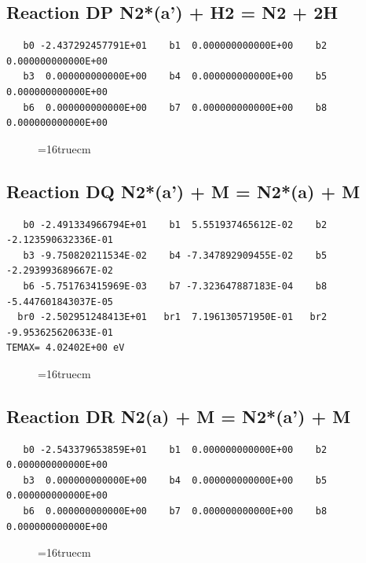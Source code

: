 \documentclass[12pt,dvipdfm]{article}
\begin{document}
\subsection{
Reaction DP N2*(a') + H2 = N2 + 2H}
\begin{small}\begin{verbatim}
   b0 -2.437292457791E+01    b1  0.000000000000E+00    b2  0.000000000000E+00
   b3  0.000000000000E+00    b4  0.000000000000E+00    b5  0.000000000000E+00
   b6  0.000000000000E+00    b7  0.000000000000E+00    b8  0.000000000000E+00
   \end{verbatim}\end{small}
\begin{figure}[h!]
\label{n2rates}
\epsfxsize=16truecm
\end{figure}
\newpage

\subsection{
Reaction DQ N2*(a') + M = N2*(a) + M }
\begin{small}\begin{verbatim}
   b0 -2.491334966794E+01    b1  5.551937465612E-02    b2 -2.123590632336E-01
   b3 -9.750820211534E-02    b4 -7.347892909455E-02    b5 -2.293993689667E-02
   b6 -5.751763415969E-03    b7 -7.323647887183E-04    b8 -5.447601843037E-05
  br0 -2.502951248413E+01   br1  7.196130571950E-01   br2 -9.953625620633E-01
TEMAX= 4.02402E+00 eV
   \end{verbatim}\end{small}
\begin{figure}[h!]
\label{n2rates}
\epsfxsize=16truecm
\end{figure}
\newpage

\subsection{
Reaction DR N2(a) + M = N2*(a') + M }
\begin{small}\begin{verbatim}
   b0 -2.543379653859E+01    b1  0.000000000000E+00    b2  0.000000000000E+00
   b3  0.000000000000E+00    b4  0.000000000000E+00    b5  0.000000000000E+00
   b6  0.000000000000E+00    b7  0.000000000000E+00    b8  0.000000000000E+00
   \end{verbatim}\end{small}
\begin{figure}[h!]
\label{n2rates}
\epsfxsize=16truecm
\end{figure}
\newpage
\end{document}
